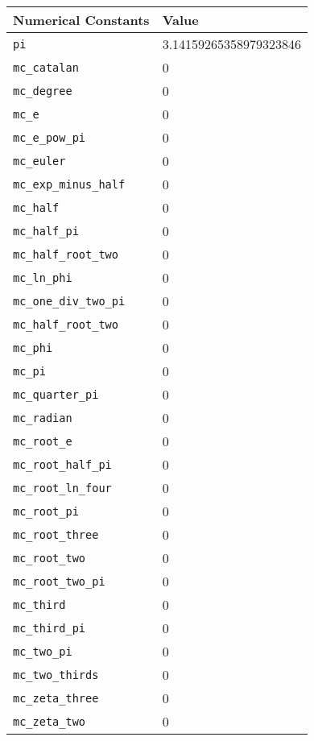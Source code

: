 \begin{tabular}{ll} \hline
Numerical Constants & Value  \\ \hline
{\tt pi} \index{pi}      & 3.14159265358979323846  \\
{\tt mc\_catalan} \index{mc\_catalan}  & 0 \\
{\tt mc\_degree} \index{mc\_degree}  & 0 \\
{\tt mc\_e} \index{mc\_e}  & 0 \\
{\tt mc\_e\_pow\_pi} \index{mc\_e\_pow\_pi}  & 0 \\
{\tt mc\_euler} \index{mc\_euler}  & 0 \\
{\tt mc\_exp\_minus\_half} \index{mc\_exp\_minus\_half}  & 0 \\
{\tt mc\_half} \index{mc\_half}  & 0 \\
{\tt mc\_half\_pi} \index{mc\_half\_pi}  & 0 \\
{\tt mc\_half\_root\_two} \index{mc\_half\_root\_two}  & 0 \\
{\tt mc\_ln\_phi} \index{mc\_ln\_phi}  & 0 \\
{\tt mc\_one\_div\_two\_pi} \index{mc\_one\_div\_two\_pi}  & 0 \\
{\tt mc\_half\_root\_two} \index{mc\_half\_root\_two}  & 0 \\
{\tt mc\_phi} \index{mc\_phi}  & 0 \\
{\tt mc\_pi} \index{mc\_pi}  & 0 \\
{\tt mc\_quarter\_pi} \index{mc\_quarter\_pi}  & 0 \\
{\tt mc\_radian} \index{mc\_radian}  & 0 \\
{\tt mc\_root\_e} \index{mc\_root\_e}  & 0 \\
{\tt mc\_root\_half\_pi} \index{mc\_root\_half\_pi}  & 0 \\
{\tt mc\_root\_ln\_four} \index{mc\_root\_ln\_four}  & 0 \\
{\tt mc\_root\_pi} \index{mc\_root\_pi}  & 0 \\
{\tt mc\_root\_three} \index{mc\_root\_three}  & 0 \\
{\tt mc\_root\_two} \index{mc\_root\_two}  & 0 \\
{\tt mc\_root\_two\_pi} \index{mc\_root\_two\_pi}  & 0 \\
{\tt mc\_third} \index{mc\_third}  & 0 \\
{\tt mc\_third\_pi} \index{mc\_third\_pi}  & 0 \\
{\tt mc\_two\_pi} \index{mc\_two\_pi}  & 0 \\
{\tt mc\_two\_thirds} \index{mc\_two\_thirds}  & 0 \\
{\tt mc\_zeta\_three} \index{mc\_zeta\_three}  & 0 \\
{\tt mc\_zeta\_two} \index{mc\_zeta\_two}  & 0 \\
\end{tabular}
